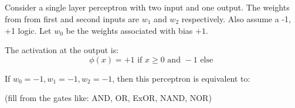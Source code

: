 \begin{frame}
\section{}
Consider a single layer perceptron with two input and one output. The weights from from first and second inputs are $w_1$ and $w_2$ respectively. Also assume a -1, +1 logic. Let $w_0$ be the weights associated with bias $+1$.



The activation at the output is:
\[ \phi(x) = +1 \mbox{ if } x\geq 0  \mbox{ and } -1 \mbox{ else }\]


If $w_0 = -1, w_1 = -1, w_2 = -1 $, then this perceptron is equivalent to:

(fill from the gates like: AND, OR, ExOR, NAND, NOR)

\end{frame}
